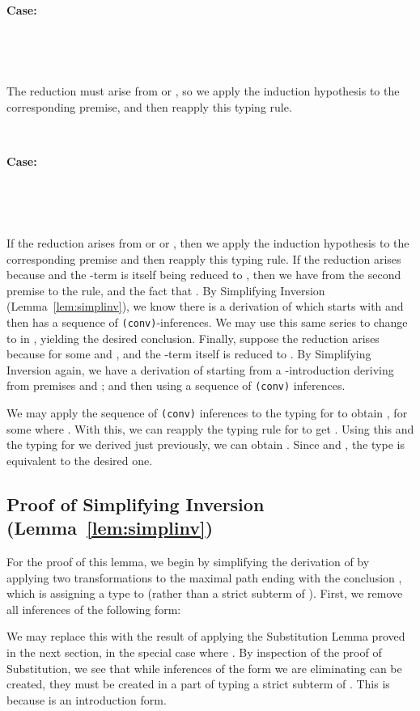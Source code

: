 \documentclass[copyright]{eptcs}
\begin{document}
\ 

\noindent \textbf{Case:}

\



\ 

\noindent The reduction must arise from  or , so we apply the induction hypothesis to the corresponding premise,
and then reapply this typing rule.

\ 

\noindent \textbf{Case:}

\



\ 

\noindent If the reduction arises from  or 
or , then we apply the induction hypothesis to the
corresponding premise and then reapply this typing rule.  If the
reduction arises because  and the -term is
itself being reduced to , then we have  from the second premise to the rule, and the fact
that .  By Simplifying Inversion
(Lemma~\ref{lem:simplinv}), we know there is a derivation of
 which starts with
 and then has a
sequence  of \texttt{(conv)}-inferences.  We may use this same
series  to change  to  in ,
yielding the desired conclusion.  Finally, suppose the reduction
arises because  for some  and ,
and the -term itself is reduced to
.  By Simplifying Inversion again,
we have a derivation of  starting from a
-introduction deriving  from premises  and ; and then
using a sequence  of \texttt{(conv)} inferences.

We may apply the sequence  of \texttt{(conv)} inferences to the
typing for  to obtain , for some  where
.  With this, we can reapply the typing rule for
 to get
.  Using this
and the typing for  we derived just previously, we can obtain
.
Since  and , the type
is equivalent to the desired one.

\subsection{Proof of Simplifying Inversion (Lemma~\ref{lem:simplinv})}
\label{sec:simplinv}

For the proof of this lemma, we begin by simplifying the derivation
 of  by applying two transformations
to the maximal path ending with the conclusion , which is
assigning a type to  (rather than a strict subterm of ). First,
we remove all inferences of the following form:

\noindent We may replace this with the result of applying the
Substitution Lemma proved in the next section, in the special case
where .  By inspection of the proof of
Substitution, we see that while inferences of the form we are eliminating
can be created, they must be created in a part of  typing
a strict subterm of .  This is because  is an introduction form.
\end{document}
